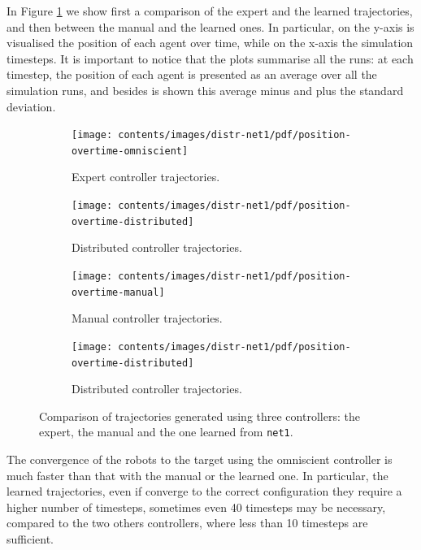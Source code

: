 In Figure \ref{fig:net1traj} we show first a comparison of the expert and the 
learned trajectories, and then between the manual and the learned ones. In 
particular, on the y-axis is visualised the position of each agent over time, while 
on the x-axis the simulation timesteps. It is important to notice that the plots 
summarise all the runs: at each timestep, the position of each agent is presented 
as an average over all the simulation runs, and besides is  shown this average 
minus and plus the standard deviation.
\begin{figure}[!htb]
	\centering
	\begin{subfigure}[h]{0.49\textwidth}
		\centering
		\texttt{[image: contents/images/distr-net1/pdf/position-overtime-omniscient]}%
		\caption{Expert controller trajectories.}
	\end{subfigure}
	\hfill
	\begin{subfigure}[h]{0.49\textwidth}
		\centering
		\texttt{[image: contents/images/distr-net1/pdf/position-overtime-distributed]}
		\caption{Distributed controller trajectories.}
	\end{subfigure}
	\hspace*{\fill}%
	
	\vspace*{8pt}%
	
	\hspace*{\fill}%
	\begin{subfigure}[h]{0.49\textwidth}
		\centering
		\texttt{[image: contents/images/distr-net1/pdf/position-overtime-manual]}%
		\caption{Manual controller trajectories.}
	\end{subfigure}
	\hfill
	\begin{subfigure}[h]{0.49\textwidth}
		\centering
		\texttt{[image: contents/images/distr-net1/pdf/position-overtime-distributed]}
		\caption{Distributed controller trajectories.}
	\end{subfigure}
	\caption[Evaluation of the trajectories learned by \texttt{net1}.]{Comparison 
		of trajectories generated using three controllers: the expert, the manual and 
		the one learned from \texttt{net1}.}
	\label{fig:net1traj}
\end{figure}

The convergence of the robots to the target using the omniscient controller is 
much faster than that with the manual or the learned one. In particular, the 
learned trajectories, even if converge to the correct configuration they require a 
higher number of timesteps, sometimes even 40 timesteps may be necessary, 
compared to the two others controllers, where less than 10 timesteps are 
sufficient.

